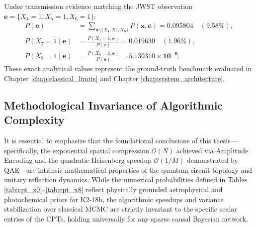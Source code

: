 Under transmission evidence matching the JWST observation $\mathbf{e} = \{X_4 = 1, X_5 = 1, X_6 = 1\}$:
\begin{align}
P(\mathbf{e}) &= \sum_{\mathbf{x} \setminus \{X_4, X_5, X_6\}} P(\mathbf{x}, \mathbf{e}) = \mathbf{0.095804} \quad (9.58\%), \\
P(X_7 = 1 \mid \mathbf{e}) &= \frac{P(X_7 = 1, \mathbf{e})}{P(\mathbf{e})} = \mathbf{0.019630} \quad (1.96\%), \\
P(X_8 = 1 \mid \mathbf{e}) &= \frac{P(X_8 = 1, \mathbf{e})}{P(\mathbf{e})} = \mathbf{5.130310 \times 10^{-6}}.
\end{align}
These exact analytical values represent the ground-truth benchmark evaluated in Chapter \ref{chap:classical_limits} and Chapter \ref{chap:system_architecture}.

\subsection{Methodological Invariance of Algorithmic Complexity}\label{subsec:app_algorithmic_invariance}
It is essential to emphasize that the foundational conclusions of this thesis—specifically, the exponential spatial compression $\mathcal{O}(N)$ achieved via Amplitude Encoding and the quadratic Heisenberg speedup $\mathcal{O}(1/M)$ demonstrated by QAE—are intrinsic mathematical properties of the quantum circuit topology and unitary reflection dynamics. While the numerical probabilities defined in Tables \ref{tab:cpt_x0}--\ref{tab:cpt_x8} reflect physically grounded astrophysical and photochemical priors for K2-18b, the algorithmic speedups and variance stabilization over classical MCMC are strictly invariant to the specific scalar entries of the CPTs, holding universally for any sparse causal Bayesian network.
